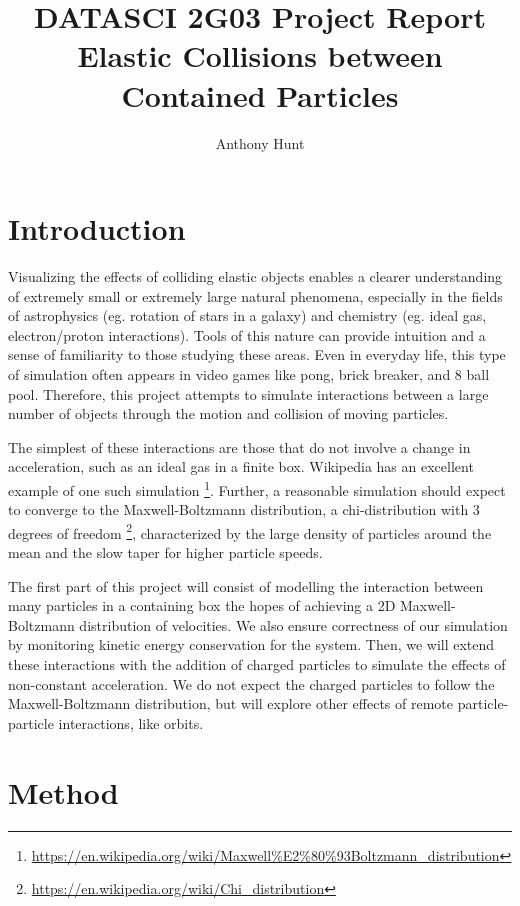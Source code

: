 \documentclass{article}
\title{DATASCI 2G03 Project Report \\\large
Elastic Collisions between Contained Particles}
\author{Anthony Hunt}
\begin{document}
\maketitle

\tableofcontents

\section{Introduction}
Visualizing the effects of colliding elastic objects enables a clearer understanding of extremely small or extremely large natural phenomena,
especially in the fields of astrophysics (eg. rotation of stars in a galaxy) and chemistry (eg. ideal gas, electron/proton interactions).
Tools of this nature can provide intuition and a sense of familiarity to those studying these areas.
Even in everyday life, this type of simulation often appears in video games like pong, brick breaker, and 8 ball pool.
Therefore, this project attempts to simulate interactions between a large number of objects through
the motion and collision of moving particles.

The simplest of these interactions are those that do not involve a change in acceleration,
such as an ideal gas in a finite box. Wikipedia has an excellent example of one such simulation
\footnote{\url{https://en.wikipedia.org/wiki/Maxwell\%E2\%80\%93Boltzmann_distribution}}.
Further, a reasonable simulation should expect to converge to the Maxwell-Boltzmann distribution,
a chi-distribution with 3 degrees of freedom \footnote{\url{https://en.wikipedia.org/wiki/Chi_distribution}},
characterized by the large density of particles around the mean and the slow taper for higher particle speeds.

The first part of this project will consist of modelling the interaction between many particles
in a containing box the hopes of achieving a 2D Maxwell-Boltzmann distribution of velocities.
We also ensure correctness of our simulation by monitoring kinetic energy conservation for the system.
Then, we will extend these interactions with the addition of charged particles to simulate the effects of non-constant acceleration.
We do not expect the charged particles to follow the Maxwell-Boltzmann distribution,
but will explore other effects of remote particle-particle interactions, like orbits.


\section{Method}
\end{document}
